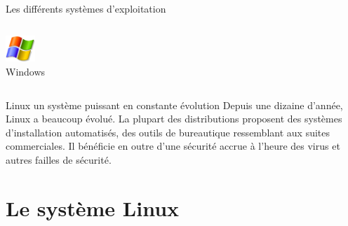 \begin{frame}{Les différents systèmes d'exploitation}
\begin{columns}
\begin{column}{58mm}
\begin{block}{\center \includegraphics[height=1cm]{img/s01/Windows_logo.png}\\Windows}
        \vrule
      \end{block}
    \end{column}
  \end{columns}
  \begin{alertblock}{Linux un système puissant en constante évolution}
    Depuis une dizaine d'année, Linux a beaucoup évolué. La plupart des
    distributions proposent des systèmes d'installation automatisés, des
    outils de bureautique ressemblant aux suites commerciales. Il
    bénéficie en outre d'une sécurité accrue à l'heure des virus et
    autres failles de sécurité.
  \end{alertblock}
\end{frame}

\section{Le système Linux}
